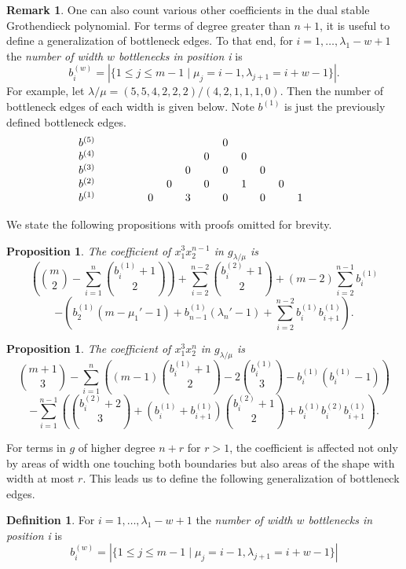 \documentclass[12pt]{amsart}
\newtheorem{prop}[thm]{Proposition}
\theoremstyle{definition}
\newtheorem{remark}[thm]{Remark}
\newtheorem{defn}[thm]{Definition}
\begin{document}
\begin{remark}
One can also count various other coefficients in the dual stable Grothendieck polynomial. For terms of degree greater than $n+1$, it is useful to define a generalization of bottleneck edges. To that end, for $i = 1,\ldots,\lambda_1-w+1$ the \textit{number of width $w$ bottlenecks in position i} is
\[
b^{(w)}_i = |\{ 1 \leq j \leq m-1 \mid \mu_j = i-1, \lambda_{j+1} = i+w-1 \}|.
\] 
For example, let $\lambda / \mu = (5,5,4,2,2,2)/(4,2,1,1,1,0)$. Then the number of bottleneck edges of each width is given below. Note $b^{(1)}$ is just the previously defined bottleneck edges.
\[\begin{tabular}{>{$}l<{$\hspace{12pt}}*{13}{c}}
b^{(5)} &&&&&&&0&&&&&&\\
b^{(4)} &&&&&&0&&0&&&&&\\
b^{(3)} &&&&&0&&0&&0&&&&\\
b^{(2)} &&&&0&&0&&1&&0&&&\\
b^{(1)} &&&0&&3&&0&&0&&1&&\\
\end{tabular}\]

We state the following propositions with proofs omitted for brevity.

\begin{prop}\label{x1_3 x2_n-1}
The coefficient of $x_1^3 x_2^{n-1}$ in $g_{\lambda/\mu}$ is 
\[
\left( \binom{m}{2} - \sum_{i=1}^{n} \binom{b^{(1)}_i+1}{2} \right) + \sum_{i=2}^{n-2} \binom{b_i^{(2)}+1}{2} + (m-2)\sum_{i=2}^{n-1} b_i^{(1)}\]\[ - 
 \left(b_2^{(1)}(m-\mu_1'-1) + b_{n-1}^{(1)}(\lambda_n'-1) + \sum_{i=2}^{n-2} b_i^{(1)}b_{i+1}^{(1)} \right).
\]
\end{prop}
\begin{prop}
The coefficient of $x_1^3 x_2^n$ in $g_{\lambda/\mu}$ is 
\[
\binom{m+1}{3} - \sum_{i=1}^{n} \left((m-1)\binom{b_i^{(1)}+1}{2} - 2 \binom{b_i^{(1)}}{3} - b_i^{(1)}(b_i^{(1)}-1) \right) \]\[ - \sum_{i=1}^{n-1} \left(\binom{b_i^{(2)}+2}{3} + (b_i^{(1)}+b_{i+1}^{(1)})\binom{b_i^{(2)}+1}{2} + b_i^{(1)}b_i^{(2)}b_{i+1}^{(1)}\right).
\]
\end{prop}

\end{remark}

\iffalse
For terms in $g$ of higher degree $n+r$ for $r > 1$, the coefficient is affected not only by areas of width one touching both boundaries but also areas of the shape with width at most $r$. This leads us to define the following generalization of bottleneck edges.
\begin{defn} 
For $i = 1,\ldots,\lambda_1-w+1$ the \textit{number of width $w$ bottlenecks in position i} is
\[
b^{(w)}_i = |\{ 1 \leq j \leq m-1 \mid \mu_j = i-1, \lambda_{j+1} = i+w-1 \}|
\]
\end{defn}
\end{document}
